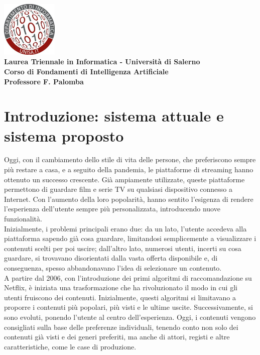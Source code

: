 \documentclass[a4paper,12pt]{article}
\begin{document}
\begin{center}
    \includegraphics[width=0.2\textwidth]{logo.jpg}\\[0.5cm]
    \textbf{\large Laurea Triennale in Informatica - Università di Salerno}\\
    \textbf{\large Corso di Fondamenti di Intelligenza Artificiale}\\
    \textbf{\large Professore F. Palomba}\\[1.5cm]
    \textcolor{titlecolor}{\Huge }
\end{center}

\vspace{-2cm}

\setcounter{tocdepth}{3}
\renewcommand{\contentsname}{\textcolor{blue}{Sommario}}
\tableofcontents

\newpage

\section{Introduzione: sistema attuale e sistema proposto}
Oggi, con il cambiamento dello stile di vita delle persone, che preferiscono sempre più restare a casa, e a seguito della pandemia, le piattaforme di streaming hanno ottenuto un successo crescente. Già ampiamente utilizzate, queste piattaforme permettono di guardare film e serie TV su qualsiasi dispositivo connesso a Internet. Con l’aumento della loro popolarità, hanno sentito l’esigenza di rendere l’esperienza dell’utente sempre più personalizzata, introducendo nuove funzionalità.\\

Inizialmente, i problemi principali erano due: da un lato, l’utente accedeva alla piattaforma sapendo già cosa guardare, limitandosi semplicemente a visualizzare i contenuti scelti per poi uscire; dall’altro lato, numerosi utenti, incerti su cosa guardare, si trovavano disorientati dalla vasta offerta disponibile e, di conseguenza, spesso abbandonavano l’idea di selezionare un contenuto.\\

A partire dal 2006, con l’introduzione dei primi algoritmi di raccomandazione su Netflix, è iniziata una trasformazione che ha rivoluzionato il modo in cui gli utenti fruiscono dei contenuti. Inizialmente, questi algoritmi si limitavano a proporre i contenuti più popolari, più visti e le ultime uscite. Successivamente, si sono evoluti, ponendo l’utente al centro dell’esperienza. Oggi, i contenuti vengono consigliati sulla base delle preferenze individuali, tenendo conto non solo dei contenuti già visti e dei generi preferiti, ma anche di attori, registi e altre caratteristiche, come le case di produzione.\\
\end{document}
